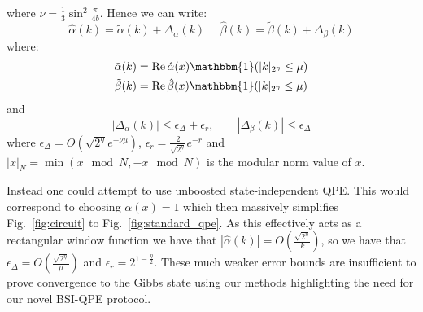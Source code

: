 \documentclass[aps,floatfix,10pt,amssymb,amsfont,amsmath,superscriptaddress,float,nofootinbib,longbibliography,nobalancelastpage,twocolumn]{revtex4-2}
\begin{document}
where $\nu = \frac{1}{3}\sin^2\frac{\pi}{4b}$. Hence we can write:
\begin{equation}
    \hat\alpha(k) = \tilde\alpha(k) + \Delta_{\alpha}(k) \>\>\>\>\>\>\hat\beta(k) = \tilde\beta(k) + \Delta_{\beta}(k)
    \label{eq:decomposealpha}
\end{equation}
where:
\begin{align}
    \tilde\alpha(k) &=\operatorname{Re} \hat\alpha(x)\mathbbm{1}(|k|_{2^{\eta}}\leq \mu)\\
    \tilde\beta(k) &= \operatorname{Re}\hat\beta(x)\mathbbm{1}(|k|_{2^{\eta}}\leq \mu)
    \label{eq:decomposealpha2}
\end{align}  and 
\begin{equation}
    |\Delta_\alpha(k)|\leq \epsilon_{\Delta}+\epsilon_r,
    \qquad |\Delta_\beta(k)|\leq \epsilon_{\Delta}
    \label{eq:decomposealpha3}
\end{equation} where $\epsilon_{\Delta} = O(\sqrt{2^{\eta}}e^{-\nu \mu})$, $\epsilon_r = \frac{2}{\sqrt{2^{\eta}}}e^{-r}$ and $|x|_N = \min(x \mod N,- x\mod N)$ is the modular norm value of $x$.


Instead one could attempt to use unboosted state-independent QPE. This would correspond to choosing $\alpha(x)=1$ which then massively simplifies Fig.~\ref{fig:circuit} to Fig.~\ref{fig:standard_qpe}. As this effectively acts as a rectangular window function we have that $|\hat\alpha(k)| = O(\frac{\sqrt{2^{\eta}}}{k})$, so we have that $\epsilon_{\Delta} = O(\frac{\sqrt{2^{\eta}}}{\mu})$ and $\epsilon_r = 2^{1-\frac{\eta}{2}}$. These much weaker error bounds are insufficient to prove convergence to the Gibbs state using our methods highlighting the need for our novel BSI-QPE protocol.
\end{document}
